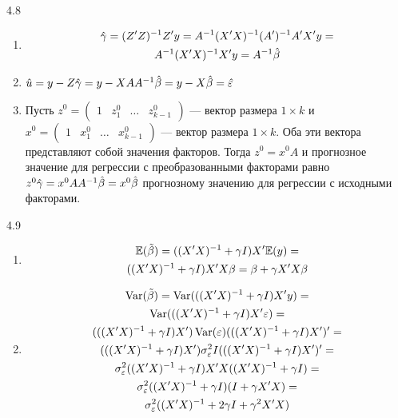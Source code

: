 \begin{solution}{{4.8}}
\begin{enumerate}
\item
\begin{multline*}
\hat{\gamma} = (Z'Z)^{-1}Z'y = A^{-1}(X'X)^{-1}(A')^{-1}A'X'y =\\
 A^{-1}(X'X)^{-1} X'y = A^{-1}\hat{\beta}
\end{multline*}
\item $\hat{u} = y - Z\hat{\gamma} = y - XAA^{-1}\hat{\beta} = y - X\hat{\beta} = \hat{\varepsilon}$
\item Пусть $z^0 = \begin{pmatrix} 1 & z_1^0 & \dots & z_{k-1}^0 \end{pmatrix}$ — вектор размера $1 \times k$ и $x^0 = \begin{pmatrix} 1 & x_1^0 & \dots & x_{k-1}^0 \end{pmatrix}$ — вектор размера $1 \times k$. Оба эти вектора представляют собой значения факторов. Тогда $z^0 = x^0 A$ и прогнозное значение для регрессии с преобразованными факторами равно $z^0 \hat{\gamma} = x^0 AA^{-1} \hat{\beta} = x^0 \hat{\beta}$ прогнозному значению для регрессии с исходными факторами.
\end{enumerate}
\end{solution}
\protect \hypertarget {soln:4.9}{}
\begin{solution}{{4.9}}
\begin{enumerate}
\item
\begin{multline*}
\mathbb{E}(\tilde{\beta}) = ((X'X)^{-1} + \gamma I)X'\mathbb{E}(y) = \\
 ((X'X)^{-1} + \gamma I)X'X\beta = \beta + \gamma X'X\beta
\end{multline*}
\item
\begin{multline*}
\operatorname{Var}(\tilde{\beta}) = \operatorname{Var}(((X'X)^{-1} + \gamma I)X'y) = \\
 \operatorname{Var}(((X'X)^{-1} + \gamma I)X'\varepsilon) = \\
 (((X'X)^{-1} + \gamma I)X')\operatorname{Var}(\varepsilon)(((X'X)^{-1} + \gamma I)X')'=  \\
  (((X'X)^{-1} + \gamma I)X')\sigma_{\varepsilon}^2 I(((X'X)^{-1} + \gamma I)X')'= \\
  \sigma_{\varepsilon}^2((X'X)^{-1} + \gamma I)X'X((X'X)^{-1} + \gamma I) = \\
  \sigma_{\varepsilon}^2((X'X)^{-1} + \gamma I)(I + \gamma X'X) =\\
   \sigma_{\varepsilon}^2((X'X)^{-1} + 2\gamma I + \gamma ^2 X'X)
\end{multline*}
\end{enumerate}
\end{solution}
